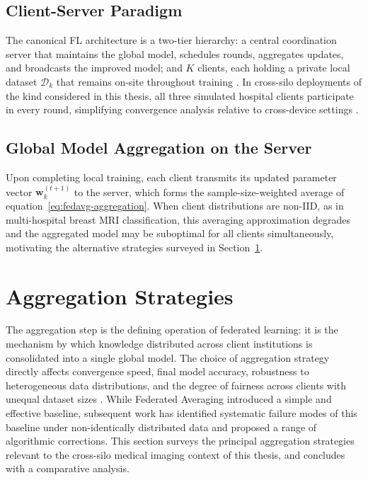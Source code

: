 \subsection{Client-Server Paradigm}
\label{sec:client-server}
\label{sec:local-training}
\label{sec:comm-rounds}

The canonical FL architecture is a two-tier hierarchy: a central coordination
server that maintains the global model, schedules rounds, aggregates updates,
and broadcasts the improved model; and $K$ clients, each holding a private local
dataset $\mathcal{D}_k$ that remains on-site throughout training
\cite{mcmahan2017communication}.
In cross-silo deployments of the kind considered in this thesis, all three
simulated hospital clients participate in every round, simplifying convergence
analysis relative to cross-device settings \cite{kairouz2021advances}.

\subsection{Global Model Aggregation on the Server}
\label{sec:global-aggregation}

Upon completing local training, each client transmits its updated parameter vector
$\mathbf{w}_k^{(t+1)}$ to the server, which forms the sample-size-weighted average
of equation~\eqref{eq:fedavg-aggregation}.
When client distributions are non-IID, as in multi-hospital breast MRI
classification, this averaging approximation degrades and the aggregated model
may be suboptimal for all clients simultaneously, motivating the alternative
strategies surveyed in Section~\ref{sec:aggregation}.



\section{Aggregation Strategies}
\label{sec:aggregation}

The aggregation step is the defining operation of federated learning:
it is the mechanism by which knowledge distributed across client
institutions is consolidated into a single global model.
The choice of aggregation strategy directly affects convergence speed,
final model accuracy, robustness to heterogeneous data distributions,
and the degree of fairness across clients with unequal dataset sizes
\cite{arbaoui2025survey}.
While Federated Averaging introduced a simple and effective baseline,
subsequent work has identified systematic failure modes of this baseline
under non-identically distributed data and proposed a range of
algorithmic corrections.
This section surveys the principal aggregation strategies relevant to
the cross-silo medical imaging context of this thesis, and concludes
with a comparative analysis.


